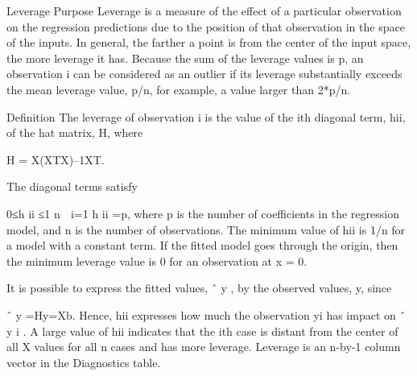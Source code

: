 Leverage
Purpose
Leverage is a measure of the effect of a particular observation on the regression predictions due to the position of that observation in the space of the inputs. In general, the farther a point is from the center of the input space, the more leverage it has. Because the sum of the leverage values is p, an observation i can be considered as an outlier if its leverage substantially exceeds the mean leverage value, p/n, for example, a value larger than 2*p/n.

Definition
The leverage of observation i is the value of the ith diagonal term, hii, of the hat matrix, H, where

H = X(XTX)–1XT.

The diagonal terms satisfy

0≤h
ii
≤1
n

i=1
h
ii
=p,
where p is the number of coefficients in the regression model, and n is the number of observations. The minimum value of hii is 1/n for a model with a constant term. If the fitted model goes through the origin, then the minimum leverage value is 0 for an observation at x = 0.

It is possible to express the fitted values, 
ˆ
y
, by the observed values, y, since

ˆ
y
=Hy=Xb.
Hence, hii expresses how much the observation yi has impact on 
ˆ
y
i
. A large value of hii indicates that the ith case is distant from the center of all X values for all n cases and has more leverage. Leverage is an n-by-1 column vector in the Diagnostics table.
